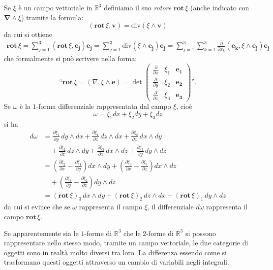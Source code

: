 \documentclass[italian,a4paper]{scrartcl}
\newcommand{\RR}{{\mathbb R}}
\newcommand{\defeq}{=}
\renewcommand{\vec}{\mathbf}
\renewcommand{\div}{\mathrm{div}}
\newcommand{\rot}{\mathbf{rot}\,}
\newcommand{\vecnabla}{\mathbf{\nabla}}
\begin{document}
Se $\xi$ è un campo vettoriale in $\RR^3$ definiamo
il suo \emph{rotore} $\rot \xi$ (anche indicato con $\vecnabla \wedge
\xi$)
tramite la formula:
\[
  (\rot \xi, \vec v) \defeq \div (\xi \wedge \vec v)
\]
da cui si ottiene
\begin{align*}
  \rot \xi = \sum_{j=1}^3 (\rot \xi,\vec{e_j})\vec{e_j}
 = \sum_{j=1}^3 \div(\xi \wedge \vec{e_j}) \vec{e_j}
 = \sum_{j=1}^3 \sum_{k=1}^3 \frac{\partial}{\partial x_k}(\vec {e_k},\xi\wedge
 \vec {e_j}) \vec{e_j}
\end{align*}
che formalmente si può scrivere nella forma:
\[
\text{``}\rot \xi = (\nabla,\xi \wedge \vec e)
= \det \begin{pmatrix}
\frac{\partial}{\partial x} & \xi_1 & \vec{e_1}\\
\frac{\partial}{\partial y} & \xi_2 & \vec{e_2}\\
\frac{\partial}{\partial z} & \xi_3 & \vec{e_3}
\end{pmatrix}
\text{''}.
\]
Se $\omega$ è la $1$-forma differenziale rappresentata dal
campo $\xi$, cioè
\[
 \omega = \xi_1 dx + \xi_2 dy + \xi_3 dz
\]
si ha
\begin{align*}
d \omega
&= \frac{\partial \xi_1}{\partial y}\, dy\wedge dx
+ \frac{\partial \xi_1}{\partial z}\, dz\wedge dx
+ \frac{\partial \xi_2}{\partial x}\, dx\wedge dy
\\
& \quad + \frac{\partial \xi_2}{\partial z}\, dz\wedge dy
+ \frac{\partial \xi_3}{\partial x}\, dx\wedge dz
+ \frac{\partial \xi_3}{\partial y}\, dy\wedge dz
\\
&=
\left(\frac{\partial \xi_2}{\partial x}-\frac{\partial \xi_1}{\partial y}\right) dx\wedge dy
+ \left(\frac{\partial \xi_3}{\partial x} - \frac{\partial \xi_1}{\partial z}\right) dx\wedge dz\\
&\quad + \left(\frac{\partial \xi_3}{\partial y} - \frac{\partial
  \xi_2}{\partial z}\right)  dy\wedge dz\\
&=  (\rot \xi)_3\, dx\wedge dy
  + (\rot \xi)_2\, dz\wedge dx
  + (\rot \xi)_1\, dy\wedge dz
\end{align*}
da cui si evince che se $\omega$ rappresenta il campo $\xi$, il
differenziale $d\omega$ rappresenta il campo $\rot \xi$.

Se apparentemente sia le $1$-forme di $\RR^3$ che le $2$-forme di
$\RR^3$ si possono rappresentare nello stesso modo, tramite un campo
vettoriale, le due categorie di oggetti sono in realtà molto diversi
tra loro. La differenza essendo come si trasformano questi oggetti
attraverso un cambio di variabili negli integrali.
\end{document}

